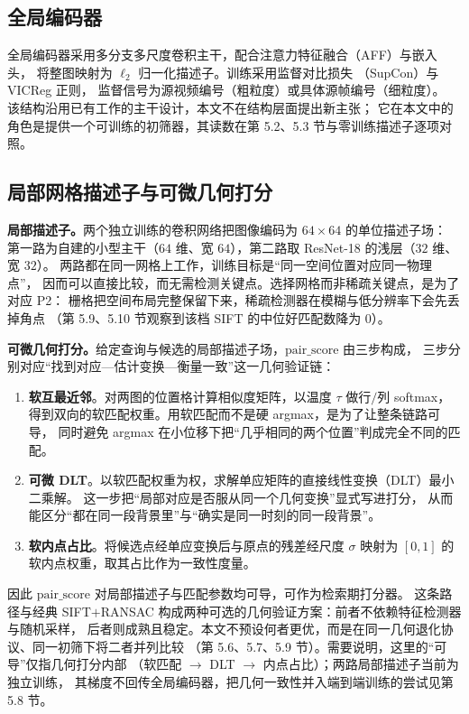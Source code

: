 \subsection{全局编码器}

全局编码器采用多分支多尺度卷积主干，配合注意力特征融合（AFF）与嵌入头，
将整图映射为 $\ell_2$ 归一化描述子。训练采用监督对比损失
（SupCon\cite{khosla2020supcon}）与 VICReg\cite{bardes2022vicreg} 正则，
监督信号为源视频编号（粗粒度）或具体源帧编号（细粒度）。
该结构沿用已有工作的主干设计，本文不在结构层面提出新主张；
它在本文中的角色是提供一个可训练的初筛器，其读数在第 5.2、5.3 节与零训练描述子逐项对照。

\subsection{局部网格描述子与可微几何打分}
\label{sec:geo-module}

\textbf{局部描述子。}两个独立训练的卷积网络把图像编码为 $64\times64$ 的单位描述子场：
第一路为自建的小型主干（$64$ 维、宽 $64$），第二路取 ResNet-18 的浅层（$32$ 维、宽 $32$）。
两路都在同一网格上工作，训练目标是“同一空间位置对应同一物理点”，
因而可以直接比较，而无需检测关键点。选择网格而非稀疏关键点，是为了对应 P2：
栅格把空间布局完整保留下来，稀疏检测器在模糊与低分辨率下会先丢掉角点
（第 5.9、5.10 节观察到该档 SIFT 的中位好匹配数降为 $0$）。

\textbf{可微几何打分。}给定查询与候选的局部描述子场，$\mathrm{pair\_score}$ 由三步构成，
三步分别对应“找到对应—估计变换—衡量一致”这一几何验证链：

\begin{enumerate}[leftmargin=1.6em,itemsep=1pt]
\item \textbf{软互最近邻}。对两图的位置格计算相似度矩阵，以温度 $\tau$ 做行$/$列 softmax，
      得到双向的软匹配权重。用软匹配而不是硬 argmax，是为了让整条链路可导，
      同时避免 argmax 在小位移下把“几乎相同的两个位置”判成完全不同的匹配。
\item \textbf{可微 DLT}。以软匹配权重为权，求解单应矩阵的直接线性变换（DLT）最小二乘解。
      这一步把“局部对应是否服从同一个几何变换”显式写进打分，
      从而能区分“都在同一段背景里”与“确实是同一时刻的同一段背景”。
\item \textbf{软内点占比}。将候选点经单应变换后与原点的残差经尺度 $\sigma$ 映射为
      $[0,1]$ 的软内点权重，取其占比作为一致性度量。
\end{enumerate}

因此 $\mathrm{pair\_score}$ 对局部描述子与匹配参数均可导，可作为检索期打分器。
这条路径与经典 SIFT$+$RANSAC 构成两种可选的几何验证方案：前者不依赖特征检测器与随机采样，
后者则成熟且稳定。本文不预设何者更优，而是在同一几何退化协议、同一初筛下将二者并列比较
（第 5.6、5.7、5.9 节）。需要说明，这里的“可导”仅指几何打分内部
（软匹配 $\rightarrow$ DLT $\rightarrow$ 内点占比）；两路局部描述子当前为独立训练，
其梯度不回传全局编码器，把几何一致性并入端到端训练的尝试见第 5.8 节。

